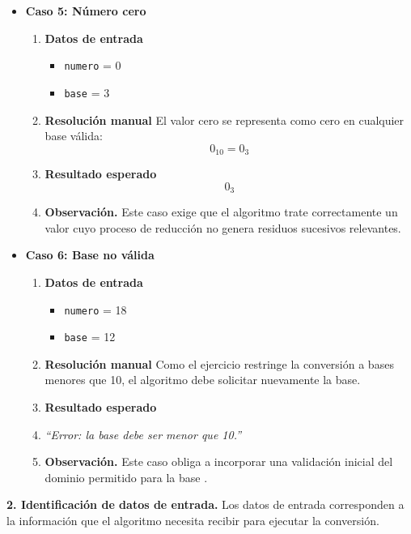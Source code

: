\documentclass[12pt,twoside]{book}
\begin{document}
\begin{itemize}
						\item \textbf{Caso 5: Número cero}
						\begin{enumerate}
							\item \textbf{Datos de entrada}
							\begin{itemize}
								\item \texttt{numero} = 0
								\item \texttt{base} = 3
							\end{itemize}
							\item \textbf{Resolución manual}
							El valor cero se representa como cero en cualquier base válida:
							\[
							0_{10}=0_3
							\]
							\item \textbf{Resultado esperado}
							\[
							0_3
							\]
							\item \textbf{Observación.} Este caso exige que el algoritmo trate correctamente un valor cuyo proceso de reducción no genera residuos sucesivos relevantes.
						\end{enumerate}
						
						
						\item \textbf{Caso 6: Base no válida}
						\begin{enumerate}
							\item \textbf{Datos de entrada}
							\begin{itemize}
								\item \texttt{numero} = 18
								\item \texttt{base} = 12
							\end{itemize}
							\item \textbf{Resolución manual}
							Como el ejercicio restringe la conversión a bases menores que 10, el algoritmo debe solicitar nuevamente la base.
							\item \textbf{Resultado esperado}
							\item \textit{``Error: la base debe ser menor que 10.''}
							\item \textbf{Observación.} Este caso obliga a incorporar una validación inicial del dominio permitido para la base \cite{Pressman2019Software,Sommerville2015Software}.
						\end{enumerate}
					\end{itemize}
					
					\noindent
					\textbf{2. Identificación de datos de entrada.}
					Los datos de entrada corresponden a la información que el algoritmo necesita recibir para ejecutar la conversión.
					
\end{document}
